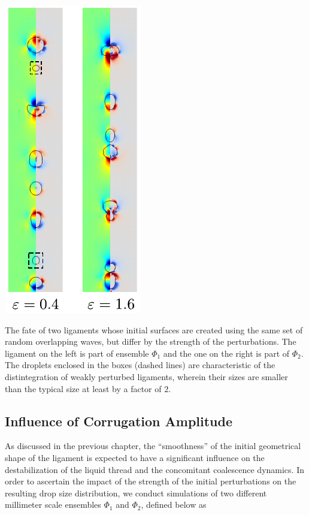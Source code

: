 


\begin{marginfigure}[2cm]
\centering
\includegraphics{plots/drop_stats/amp_long_compare.pdf}
	\caption{The fate of two ligaments whose initial surfaces 
	are created using the same set of random overlapping waves, 
	but differ by the strength of the perturbations.
	The ligament on the left is part of ensemble $\Phi_1$ 
	and the one on the right is part of $\Phi_2$. 
	The droplets enclosed in the boxes (dashed lines)
	are characteristic of the distintegration of weakly perturbed ligaments,
	wherein their sizes are smaller than the typical size at least by a factor of $2$. 
	}
\label{amp_long_comp}
\end{marginfigure}


\subsection*{Influence of Corrugation Amplitude}
As discussed in the previous chapter, the ``smoothness'' of the initial geometrical
shape of the ligament is expected to have a significant influence on the 
destabilization of the liquid thread and the concomitant coalescence dynamics.
In order to ascertain the impact of the strength of the initial perturbations
on the resulting drop size distribution, we conduct simulations of two different 
millimeter scale ensembles $\Phi_1$ and $\Phi_2$, defined below as 


